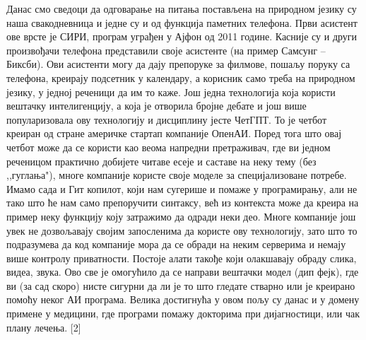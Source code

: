 Данас смо сведоци да одговарање на питања постављена на природном језику су наша свакодневница и једне су и од функција паметних телефона. Први асистент ове врсте је СИРИ, програм уграђен у Ајфон од 2011 године. Касније су и други произвођачи телефона представили своје асистенте (на пример Самсунг – Биксби). Ови асистенти могу да дају препоруке за филмове, пошаљу поруку са телефона, креирају подсетник у календару, а корисник само треба на природном језику, у једној реченици да им то каже.
Још једна технологија која користи вештачку интелигенцију, а која је отворила бројне дебате и још више популаризовала ову технологију и дисциплину јесте ЧетГПТ. То је четбот креиран од стране америчке стартап компаније ОпенАИ. Поред тога што овај четбот може да се користи као веома напредни претраживач, где ви једном реченицом практично добијете читаве есеје и саставе на неку тему (без ,,гуглања"), многе компаније користе своје моделе за специјализоване потребе. Имамо сада и Гит копилот, који нам сугерише и помаже у програмирању, али не тако што ће нам само препоручити синтаксу, већ из контекста може да креира на пример неку функцију коју затражимо да одради неки део. Многе компаније још увек не дозвољавају својим запосленима да користе ову технологију, зато што то подразумева да код компаније мора да се обради на неким серверима и немају више контролу приватности. Постоје алати такође који олакшавају обраду слика, видеа, звука. Ово све је омогућило да се направи вештачки модел (дип фејк), где ви (за сад скоро) нисте сигурни да ли је то што гледате стварно или је креирано помоћу неког АИ програма.
Велика достигнућа у овом пољу су данас и у домену примене у медицини, где програми помажу докторима при дијагностици, или чак плану лечења. [2]